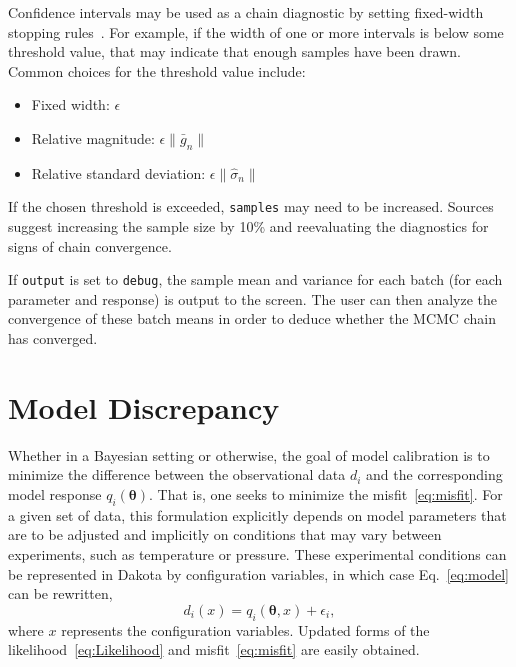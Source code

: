 Confidence intervals may be used as a chain diagnostic by setting fixed-width
stopping rules~\cite{Rob18}. For example, if the width of one or more 
intervals is below some threshold value, that may indicate that enough samples 
have been drawn. Common choices for the threshold value include:
\begin{itemize}
  \item Fixed width: $\epsilon$
  \item Relative magnitude: $\epsilon \| \bar{g}_{n} \|$
  \item Relative standard deviation: $\epsilon \| \hat{\sigma}_{n} \|$
\end{itemize}
If the chosen threshold is exceeded, \texttt{samples} may need to be increased.
Sources~\cite{Fle10, Rob18} suggest increasing the sample size by 10\% and 
reevaluating the diagnostics for signs of chain convergence. 

If \texttt{output} is set to \texttt{debug}, the sample mean and variance
for each batch (for each parameter and response) is output to the screen. The
user can then analyze the convergence of these batch means in order to 
deduce whether the MCMC chain has converged.

\section{Model Discrepancy}\label{uq:model_disc}

Whether in a Bayesian setting or otherwise, the goal of model calibration
is to minimize the difference between the observational data $d_i$ and 
the corresponding model response $q_i(\boldsymbol{\theta})$. That is, one seeks
to minimize the misfit~\ref{eq:misfit}. For a given set of data, this 
formulation explicitly depends on model parameters that are to be adjusted and
implicitly on conditions that may vary between experiments, such as temperature
or pressure. These experimental conditions can be represented in Dakota by
configuration variables, in which case Eq.~\ref{eq:model} can be rewritten,
\begin{equation}
d_i(x) = q_i(\boldsymbol{\theta}, x) + \epsilon_i, 
\end{equation} 
where $x$ represents the configuration variables. Updated forms of the 
likelihood~\ref{eq:Likelihood} and misfit~\ref{eq:misfit} are easily obtained.

